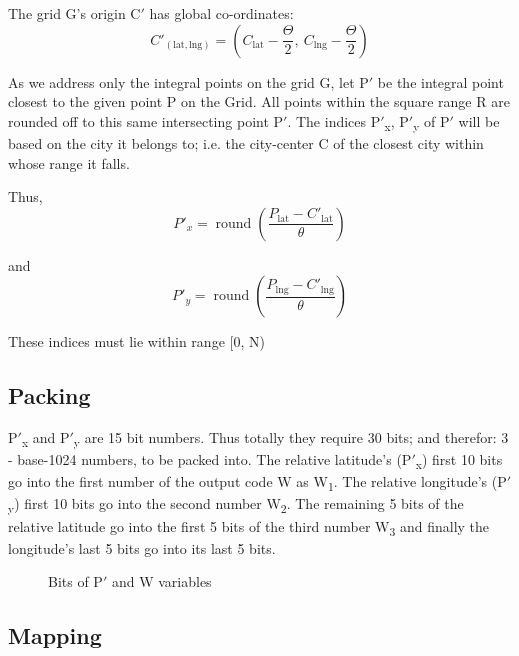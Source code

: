 \documentclass[conference]{IEEEtran}
\begin{document}
The grid G's origin C$'$ has global co-ordinates:
\begin{equation}
C'_{(\mathrm{lat},\mathrm{lng})} = \left(C_{\mathrm{lat}} - \frac{\Theta}{2},\ C_{\mathrm{lng}} - \frac{\Theta}{2}\right)
\end{equation}

As we address only the integral points on the grid G, let P$'$ be the integral point closest to the given point P on the Grid.
All points within the square range R are rounded off to this same intersecting point P$'$.
The indices P$'$\textsubscript{x}, P$'$\textsubscript{y} of P$'$ will be based on the city it belongs to;
i.e. the city-center C of the closest city within whose range it falls.


Thus, \begin{equation}
P'_x = \operatorname{round}\left(\frac{P_{\mathrm{lat}} - C'_{\mathrm{lat}}}{\theta}\right)
\end{equation}

and \begin{equation}
P'_y = \operatorname{round}\left(\frac{P_{\mathrm{lng}} - C'_{\mathrm{lng}}}{\theta}\right)
\end{equation}

These indices must lie within range [0, N)

\subsection{Packing}
P$'$\textsubscript{x} and P$'$\textsubscript{y} are 15 bit numbers.
Thus totally they require 30 bits; and therefor: 3 - base-1024 numbers, to be packed into.
The relative latitude's (P$'$\textsubscript{x}) first 10 bits go into the first number of the output code W as W\textsubscript{1}. The relative longitude's (P$'$\textsubscript{y}) first 10 bits go into the second number W\textsubscript{2}. The remaining 5 bits of the relative latitude go into the first 5 bits of the third number W\textsubscript{3} and finally the longitude's last 5 bits go into its last 5 bits.
\begin{figure}[H]
\centerline{}
\caption{Bits of P$'$ and W variables}
\label{Packing}
\end{figure}

\subsection{Mapping}
\end{document}
